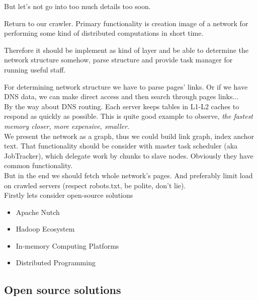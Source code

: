 \documentclass[9pt]{extarticle}
\begin{document}
\begin{multicols}{2}
\begin{center}
But let's not go into too much details too soon.
\end{center}


\columnbreak

Return to our crawler. Primary functionality is creation image of a network for
performing some kind of distributed computations in short time.   

Therefore it should be implement as kind of layer and be able to determine the
network structure somehow, parse structure and provide task manager for running
useful staff. 

For determining network structure we have to parse pages' links. Or if we
have DNS data, we can make direct access and then search through pages links...\\ 

{\footnotesize
By the way about DNS routing. Each server keeps tables in L1-L2 caches to
respond as quickly as possible. This is quite good example to observe,
\textit{the fastest memory closer, more expensive, smaller.}
}\\

We present the network as a graph, thus we could build link graph, index anchor
text. That functionality should be consider with master task scheduler (aka
JobTracker), which delegate work by chunks to slave nodes.
Obviously they have common functionality.\\

But in the end we should fetch whole network's pages. And preferably limit load
on crawled servers (respect robots.txt, be polite, don't lie).\\


Firstly lets consider open-source solutions

\begin{itemize}
\item{
    Apache Nutch
  }
\item{
    Hadoop Ecosystem
  }
\item{
    In-memory Computing Platforms
  }
\item{
    Distributed Programming
  }
\end{itemize}

\end{multicols}


\vfill
\pagebreak

\subsection*{Open source solutions}
\end{document}
